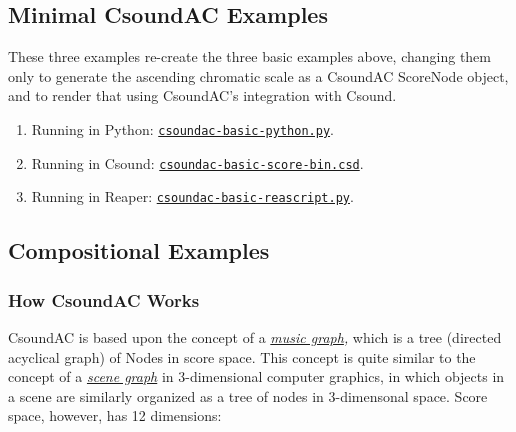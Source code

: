 \documentclass[letterpaper,10pt,DIV=12,parskip=half]{scrartcl}
\begin{document}
\subsection{Minimal CsoundAC Examples}

These three examples re-create the three basic examples above, changing them only to generate the ascending chromatic scale as a CsoundAC ScoreNode object, and to render that using CsoundAC's integration with Csound.

\begin{enumerate}

\item Running in Python: \href{https://github.com/gogins/csound-ac/blob/master/user-guide/csoundac-basic-python.py}{\lstinline|csoundac-basic-python.py|}.

\item Running in Csound: \href{https://github.com/gogins/csound-ac/blob/master/user-guide/csoundac-basic-score-bin.csd}{\lstinline|csoundac-basic-score-bin.csd|}.

\item Running in Reaper: \href{https://github.com/gogins/csound-ac/blob/master/user-guide/csoundac-basic-reascript.py}{\lstinline|csoundac-basic-reascript.py|}.

\end{enumerate}

\subsection{Compositional Examples}

\subsubsection{How CsoundAC Works}

CsoundAC is based upon the concept of a \emph{\href{https://quod.lib.umich.edu/i/icmc/bbp2372.1998.298/1}{music graph},} which is a tree (directed acyclical graph) of Nodes in score space. This concept is quite similar to the concept of a \emph{\href{https://dl.acm.org/doi/pdf/10.1145/360349.360354}{scene graph}} in 3-dimensional computer graphics, in which objects in a scene are similarly organized as a tree of nodes in 3-dimensonal space. Score space, however, has 12 dimensions:
\end{document}
